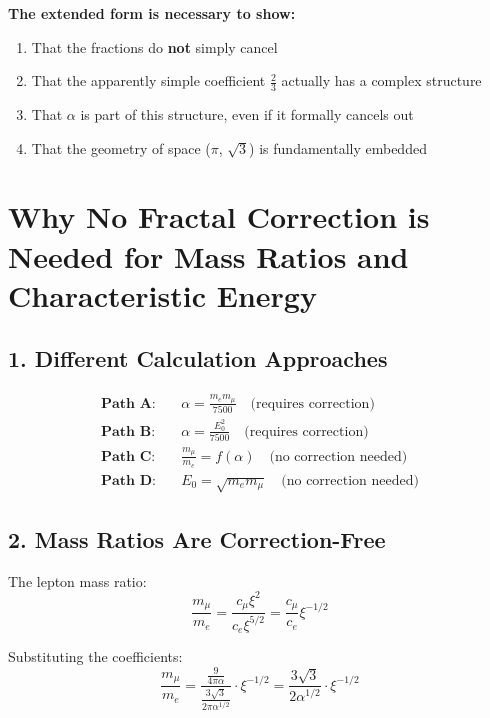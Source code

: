 \begin{tcolorbox}[colback=green!5!white,colframe=green!75!black]
	\textbf{The extended form is necessary to show:}
	\begin{enumerate}
		\item That the fractions do \textbf{not} simply cancel
		\item That the apparently simple coefficient $\frac{2}{3}$ actually has a complex structure
		\item That $\alpha$ is part of this structure, even if it formally cancels out
		\item That the geometry of space ($\pi$, $\sqrt{3}$) is fundamentally embedded
	\end{enumerate}
\end{tcolorbox}

	\section*{Why No Fractal Correction is Needed for Mass Ratios and Characteristic Energy}
	
	\subsection*{1. Different Calculation Approaches}
	
	\begin{align*}
		\textbf{Path A:} &\quad \alpha = \frac{m_e m_\mu}{7500} \quad \text{(requires correction)} \\
		\textbf{Path B:} &\quad \alpha = \frac{E_0^2}{7500} \quad \text{(requires correction)} \\
		\textbf{Path C:} &\quad \frac{m_\mu}{m_e} = f(\alpha) \quad \text{(no correction needed)} \\
		\textbf{Path D:} &\quad E_0 = \sqrt{m_e m_\mu} \quad \text{(no correction needed)}
	\end{align*}
	
	\subsection*{2. Mass Ratios Are Correction-Free}
	
	The lepton mass ratio:
	\[
	\frac{m_\mu}{m_e} = \frac{c_\mu \xi^2}{c_e \xi^{5/2}} = \frac{c_\mu}{c_e} \xi^{-1/2}
	\]
	
	Substituting the coefficients:
	\[
	\frac{m_\mu}{m_e} = \frac{\frac{9}{4\pi\alpha}}{\frac{3\sqrt{3}}{2\pi\alpha^{1/2}}} \cdot \xi^{-1/2} = \frac{3\sqrt{3}}{2\alpha^{1/2}} \cdot \xi^{-1/2}
	\]
	
